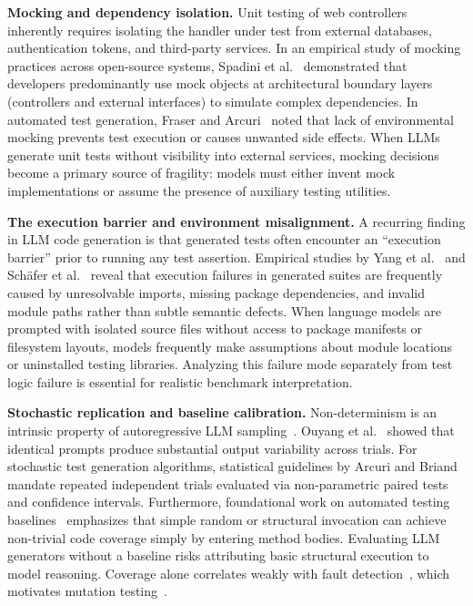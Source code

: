 \documentclass[sigconf]{acmart}
\begin{document}
\textbf{Mocking and dependency isolation.}
Unit testing of web controllers inherently requires isolating the handler under test from external databases, authentication tokens, and third-party services. In an empirical study of mocking practices across open-source systems, Spadini et al.~\cite{spadini2017mock} demonstrated that developers predominantly use mock objects at architectural boundary layers (controllers and external interfaces) to simulate complex dependencies. In automated test generation, Fraser and Arcuri~\cite{fraser2011evosuite} noted that lack of environmental mocking prevents test execution or causes unwanted side effects. When LLMs generate unit tests without visibility into external services, mocking decisions become a primary source of fragility: models must either invent mock implementations or assume the presence of auxiliary testing utilities.

\textbf{The execution barrier and environment misalignment.}
A recurring finding in LLM code generation is that generated tests often encounter an ``execution barrier'' prior to running any test assertion. Empirical studies by Yang et al.~\cite{yang2024evaluation} and Sch\"afer et al.~\cite{schafer2024testpilot} reveal that execution failures in generated suites are frequently caused by unresolvable imports, missing package dependencies, and invalid module paths rather than subtle semantic defects. When language models are prompted with isolated source files without access to package manifests or filesystem layouts, models frequently make assumptions about module locations or uninstalled testing libraries. Analyzing this failure mode separately from test logic failure is essential for realistic benchmark interpretation.

\textbf{Stochastic replication and baseline calibration.}
Non-determinism is an intrinsic property of autoregressive LLM sampling~\cite{ouyang2023nondeterminism}. Ouyang et al.~\cite{ouyang2023nondeterminism} showed that identical prompts produce substantial output variability across trials. For stochastic test generation algorithms, statistical guidelines by Arcuri and Briand~\cite{arcuri2014hitchhiker} mandate repeated independent trials evaluated via non-parametric paired tests and confidence intervals. Furthermore, foundational work on automated testing baselines~\cite{arcuri2010random} emphasizes that simple random or structural invocation can achieve non-trivial code coverage simply by entering method bodies. Evaluating LLM generators without a baseline risks attributing basic structural execution to model reasoning. Coverage alone correlates weakly with fault detection~\cite{inozemtseva2014coverage}, which motivates mutation testing~\cite{jia2011mutation}.
\end{document}
